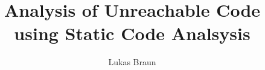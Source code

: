 \documentclass[master,english,smartquotes]{hgbthesis}
\title{Analysis of Unreachable Code using Static Code Analsysis}
\author{Lukas Braun}
\begin{document}

\frontmatter                    %

\maketitle
\tableofcontents




\mainmatter          %








\appendix                                            %


\MakeBibliography                        %




\end{document}

